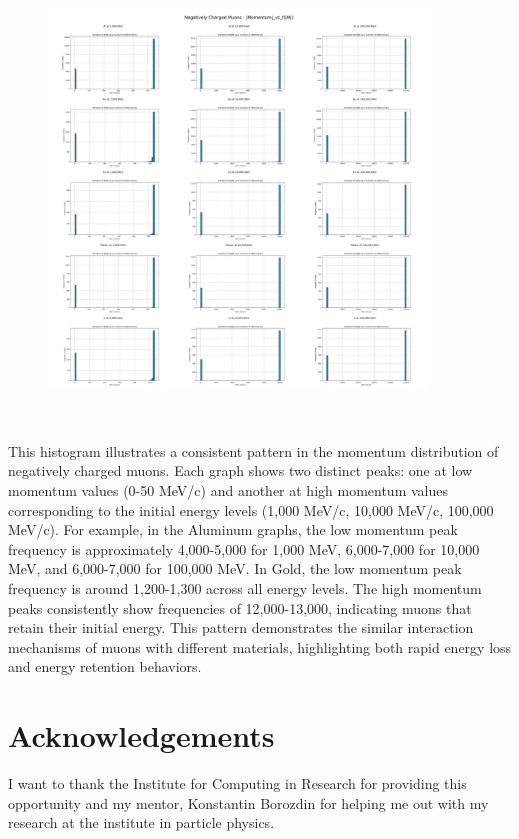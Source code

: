 \documentclass{article}
\begin{document}
\begin{figure}[H]
\centering
\includegraphics[width=0.9\textwidth]{images/Combined Plots/|Momentum|_vs_f(|M|)_mu-.png}
\end{figure}\

\noindent This histogram illustrates a consistent pattern in the momentum distribution of negatively charged muons. Each graph shows two distinct peaks: one at low momentum values (0-50 MeV/c) and another at high momentum values corresponding to the initial energy levels (1,000 MeV/c, 10,000 MeV/c, 100,000 MeV/c). For example, in the Aluminum graphs, the low momentum peak frequency is approximately 4,000-5,000 for 1,000 MeV, 6,000-7,000 for 10,000 MeV, and 6,000-7,000 for 100,000 MeV. In Gold, the low momentum peak frequency is around 1,200-1,300 across all energy levels. The high momentum peaks consistently show frequencies of 12,000-13,000, indicating muons that retain their initial energy. This pattern demonstrates the similar interaction mechanisms of muons with different materials, highlighting both rapid energy loss and energy retention behaviors.

\pagebreak

\section*{Acknowledgements}
I want to thank the Institute for Computing in Research for providing this opportunity and my mentor, Konstantin Borozdin for helping me out with my research at the institute in particle physics.



\cite{YouTubePlaylist}
\cite{GitHubGeant4}
\cite{PDG2024}
\cite{MITOCW2020}
\end{document}

